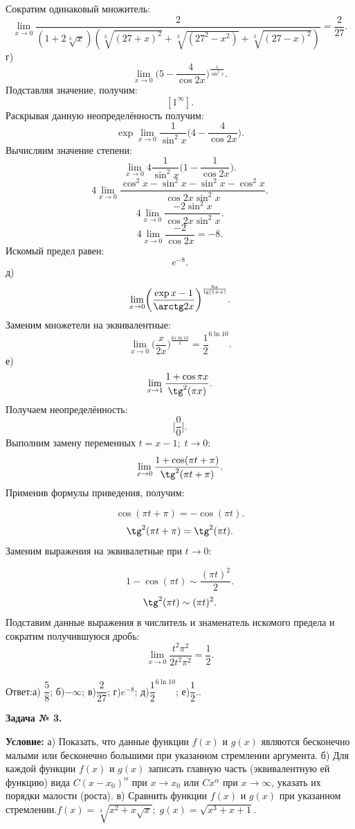 \documentclass[12pt]{article}
\begin{document}
Сократим одинаковый множитель:
$$\lim\limits_{x\rightarrow 0} \dfrac{2}{(1+2\sqrt[3]{x})(\sqrt[3]{(27+x)^2}+\sqrt[3]{(27^2-x^2)}+\sqrt[3]{(27-x)^2})}=\dfrac{2}{27}.$$
г)
 $$\lim\limits_{x\rightarrow 0} \biggl(5-\dfrac{4}{\cos{2x}}\biggl)^{\frac{1}{\sin^2{x}}}.  $$
Подставляя значение, получим:
$$[ 1^{\infty}].$$
Раскрывая данную неопределённость получим:
$$\exp{\lim\limits_{x\rightarrow 0}\frac{1}{\sin^2{x}}\biggl(4-\dfrac{4}{\cos{2x}}\biggl)}.$$
Вычисляим значение степени:
$$\lim\limits_{x\rightarrow 0}4\frac{1}{\sin^2{x}}\biggl(1-\dfrac{1}{\cos{2x}}\biggl).$$
$$ 4\lim\limits_{x\rightarrow 0}\dfrac{\cos^2{x}-\sin^2{x}-\sin^2{x}-\cos^2{x}}{\cos{2x}\sin^2{x}}.$$
$$ 4\lim\limits_{x\rightarrow 0}\dfrac{-2\sin^2{x}}{\cos{2x}\sin^2{x}}.$$
$$ 4\lim\limits_{x\rightarrow 0}\dfrac{-2}{\cos{2x}}=-8.$$
Искомый предел равен:
$$e^{-8}.$$
д)
$$\lim\limits_{x\rightarrow 0} \biggl(\dfrac{\exp{x}-1}{\arctg2x}\bigg)^\frac{6x}{\lg({1+x})}.$$
Заменим множетели на эквивалентные:
$$\lim\limits_{x\rightarrow 0} \biggl(\dfrac{x}{2x}\bigg)^\frac{6x\ln{10}}{x}=\dfrac{1}{2}^{6\ln{10}}.$$
\newpage
е)
$$\lim\limits_{x\rightarrow 1} \dfrac{1+\cos{\pi x}}{\tg^2(\pi x)}.$$
Получаем неопределённость: $$\biggl[\dfrac{0}{0}\biggr].$$
Выполним замену переменных $t = x - 1;\; t \rightarrow 0$: 
$$\lim\limits_{x\rightarrow 0} \dfrac{1+\cos(\pi t+\pi)}{\tg^2(\pi t+\pi  )}.$$
Применив формулы приведения, получим:

$$\cos(\pi t+\pi)=-\cos(\pi t).$$
$$\tg^2(\pi t+ \pi)= \tg^2(\pi t).$$
Заменим выражения на эквивалетные при $t \rightarrow 0$:

$$ 1-\cos(\pi t)  \sim \dfrac{(\pi t)^2}{2}.$$
$$\tg^2(\pi t)  \sim (\pi t)^2.$$
Подставим данные выражения в числитель и знаменатель искомого предела и сократим получившуюся дробь:
$$\lim\limits_{x\rightarrow 0} \dfrac{t^2\pi^2}{2t^2\pi^2}=\dfrac{1}{2}.$$\\
Ответ:а) $\dfrac{5}{8}$; б)$-\infty$; в)$\dfrac{2}{27}$; г)$e^{-8}$; д)$\dfrac{1}{2}^{6\ln{10}}$;
е)$\dfrac{1}{2}.$.
\newpage
\begin{center}
\textbf{Задача № 3.}   
\end{center}
\textbf{Условие:}
а) Показать, что данные функции $f(x)$ и $g(x)$ являются бесконечно малыми или бесконечно большими
при указанном стремлении аргумента. б) Для каждой функции $f(x)$ и $g(x)$ записать главную часть
(эквивалентную ей функцию)  вида $C(x-x_0)^{\alpha}$ при $x\rightarrow x_0$ или $Cx^{\alpha}$
при $x\rightarrow\infty$, указать их порядки малости (роста). в) Сравнить функции $f(x)$ и $g(x)$ при указанном стремлении.$f(x) = \sqrt[3]{x^2+x\sqrt{x}};\; g(x) = \sqrt{x^3+x+1}$.
\end{document}
